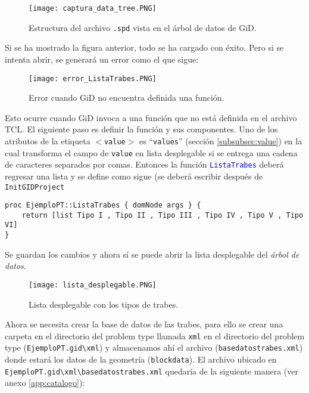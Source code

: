 \documentclass[10pt, a4paper, twocolumn]{article} %
\begin{document}
\begin{figure}[hbt!]\centering
	\texttt{[image: captura\_data\_tree.PNG]}
	\label{fig:estructura_spd}
	\caption{Estructura del archivo \texttt{.spd} vista en el árbol de datos de GiD.}
\end{figure}

Si se ha mostrado la figura anterior, todo se ha cargado con éxito. Pero si se intenta abrir, se generará un error como el que sigue:

\begin{figure}[hbt!]\centering
	\texttt{[image: error\_ListaTrabes.PNG]}
	\label{fig:error_ListaTrabes}
	\caption{Error cuando GiD no encuentra definida una función.}
\end{figure}

Esto ocurre cuando GiD invoca a una función que no está definida en el archivo TCL. El siguiente paso es definir la función y sus componentes. Uno de los atributos de la etiqueta \texttt{$<$value$>$} es ``\texttt{values}'' (sección \ref{subsubsec:value}) en la cual transforma el campo de \texttt{value} en lista desplegable si se entrega una cadena de caracteres separados por comas. Entonces la función \textcolor{blue}{\texttt{ListaTrabes}} deberá regresar una lista y se define como sigue (se deberá escribir después de \texttt{InitGIDProject}

\lstset{language=tcl} 
\begin{lstlisting}
proc EjemploPT::ListaTrabes { domNode args } {
	return [list Tipo I , Tipo II , Tipo III , Tipo IV , Tipo V , Tipo VI]
}
\end{lstlisting}

Se guardan los cambios y ahora sí se puede abrir la lista desplegable del \textit{árbol de datos}.

\begin{figure}[hbt!]\centering
	\texttt{[image: lista\_desplegable.PNG]}
	\label{fig:lista_desplegable}
	\caption{Lista desplegable con los tipos de trabes.}
\end{figure}

Ahora se necesita crear la base de datos de las trabes, para ello se crear una carpeta en el directorio del problem type llamada \texttt{xml} en el directorio del problem type (\texttt{EjemploPT.gid\textbackslash xml}) y almacenamos ahí el archivo (\texttt{basedatostrabes.xml}) donde estará los datos de la geometría (\texttt{blockdata}). El archivo ubicado en \texttt{EjemploPT.gid\textbackslash xml\textbackslash basedatostrabes.xml} quedaría de la siguiente manera (ver anexo \ref{app:catalogo}):
\end{document}
